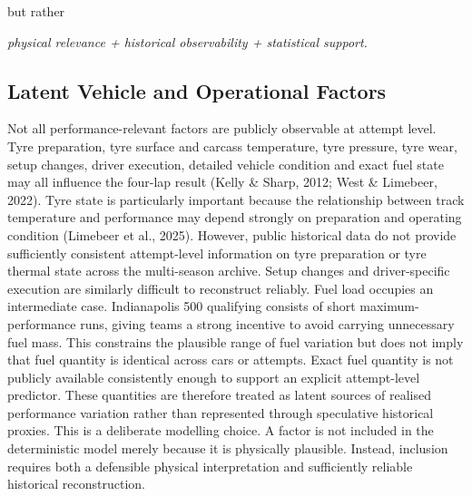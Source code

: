 but rather

\begin{center}\textit{physical relevance + historical observability + statistical support.}\end{center}

\subsection{Latent Vehicle and Operational Factors}
Not all performance-relevant factors are publicly observable at attempt level. Tyre preparation, tyre surface and carcass temperature, tyre pressure, tyre wear, setup changes, driver execution, detailed vehicle condition and exact fuel state may all influence the four-lap result (Kelly \& Sharp, 2012; West \& Limebeer, 2022). Tyre state is particularly important because the relationship between track temperature and performance may depend strongly on preparation and operating condition (Limebeer et al., 2025). However, public historical data do not provide sufficiently consistent attempt-level information on tyre preparation or tyre thermal state across the multi-season archive. Setup changes and driver-specific execution are similarly difficult to reconstruct reliably. Fuel load occupies an intermediate case. Indianapolis 500 qualifying consists of short maximum-performance runs, giving teams a strong incentive to avoid carrying unnecessary fuel mass. This constrains the plausible range of fuel variation but does not imply that fuel quantity is identical across cars or attempts. Exact fuel quantity is not publicly available consistently enough to support an explicit attempt-level predictor. These quantities are therefore treated as latent sources of realised performance variation rather than represented through speculative historical proxies. This is a deliberate modelling choice. A factor is not included in the deterministic model merely because it is physically plausible. Instead, inclusion requires both a defensible physical interpretation and sufficiently reliable historical reconstruction.

